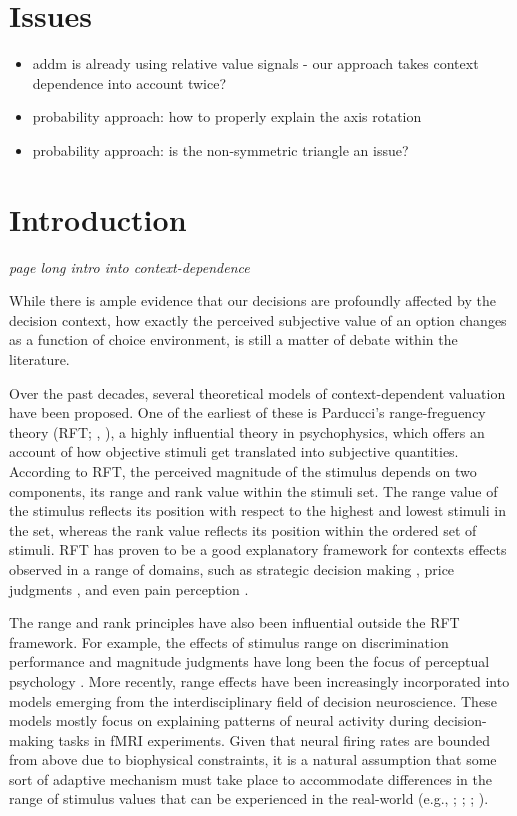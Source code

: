 \documentclass[11pt,a4paper]{article}
\begin{document}
	
	
\section{Issues}


\begin{itemize}

\item addm is already using relative value signals - our approach takes context dependence into account twice?
\item probability approach: how to properly explain the axis rotation
\item probability approach: is the non-symmetric triangle an issue?
\end{itemize}

\newpage

\section{Introduction} \label{chap1intro}

\textit{page long intro into context-dependence}

While there is ample evidence that our decisions are profoundly affected by the decision context, how exactly the perceived subjective value of an option changes as a function of choice environment, is still a matter of debate within the literature. 

Over the past decades, several theoretical models of context-dependent valuation have been proposed. One of the earliest of these is Parducci's range-freguency theory (RFT; , ), a highly influential theory in psychophysics, which offers an account of how objective stimuli get translated into subjective quantities. According to RFT, the perceived magnitude of the stimulus depends on two components, its range and rank value within the stimuli set. The range value of the stimulus reflects its position with respect to the highest and lowest stimuli in the set, whereas the rank value reflects its position within the ordered set of stimuli. RFT has proven to be a good explanatory framework for contexts effects observed in a range of domains, such as strategic decision making \cite{Vlaev2006a}, price judgments \cite{Niedrich2009}, and even pain perception \cite{Watkinson2013}.  


The range and rank principles have also been influential outside the RFT framework. For example, the effects of stimulus range on discrimination performance and magnitude judgments have long been the focus of perceptual psychology \cite{Lockhead1986}. More recently, range effects have been increasingly incorporated into models emerging from the interdisciplinary field of decision neuroscience. These models mostly focus on explaining patterns of neural activity during decision-making tasks in fMRI experiments. Given that neural firing rates are bounded from above due to biophysical constraints, it is a natural assumption that some sort of adaptive mechanism must take place to accommodate differences in the range of stimulus values that can be experienced in the real-world (e.g., ; ; ; ).
\end{document}
